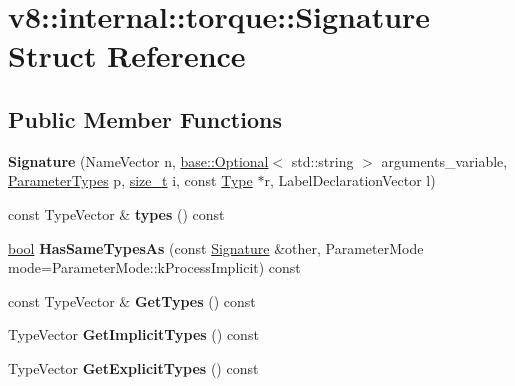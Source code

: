 \hypertarget{structv8_1_1internal_1_1torque_1_1Signature}{}\section{v8\+:\+:internal\+:\+:torque\+:\+:Signature Struct Reference}
\label{structv8_1_1internal_1_1torque_1_1Signature}
\subsection*{Public Member Functions}
\begin{DoxyCompactItemize}
\item 
\mbox{\label{structv8_1_1internal_1_1torque_1_1Signature_a7140437ec9461121fef9f7111fe0e562}} 
{\bfseries Signature} (Name\+Vector n, \mbox{\hyperlink{classv8_1_1base_1_1Optional}{base\+::\+Optional}}$<$ std\+::string $>$ arguments\+\_\+variable, \mbox{\hyperlink{structv8_1_1internal_1_1torque_1_1ParameterTypes}{Parameter\+Types}} p, \mbox{\hyperlink{classsize__t}{size\+\_\+t}} i, const \mbox{\hyperlink{classv8_1_1internal_1_1torque_1_1Type}{Type}} $\ast$r, Label\+Declaration\+Vector l)
\item 
\mbox{\label{structv8_1_1internal_1_1torque_1_1Signature_ab83f3c712c2bfd8e28ea8a8a6141ac59}} 
const Type\+Vector \& {\bfseries types} () const
\item 
\mbox{\label{structv8_1_1internal_1_1torque_1_1Signature_a91afb5db54d00cf8bbf38019f38f2110}} 
\mbox{\hyperlink{classbool}{bool}} {\bfseries Has\+Same\+Types\+As} (const \mbox{\hyperlink{structv8_1_1internal_1_1torque_1_1Signature}{Signature}} \&other, Parameter\+Mode mode=Parameter\+Mode\+::k\+Process\+Implicit) const
\item 
\mbox{\label{structv8_1_1internal_1_1torque_1_1Signature_ad6ea2472bb8531db17c86082626a6499}} 
const Type\+Vector \& {\bfseries Get\+Types} () const
\item 
\mbox{\label{structv8_1_1internal_1_1torque_1_1Signature_ac87cf33f0aa8304052885318fefe52d9}} 
Type\+Vector {\bfseries Get\+Implicit\+Types} () const
\item 
\mbox{\label{structv8_1_1internal_1_1torque_1_1Signature_aa88b644afd392dfcd84e263891b2ccba}} 
Type\+Vector {\bfseries Get\+Explicit\+Types} () const
\end{DoxyCompactItemize}
